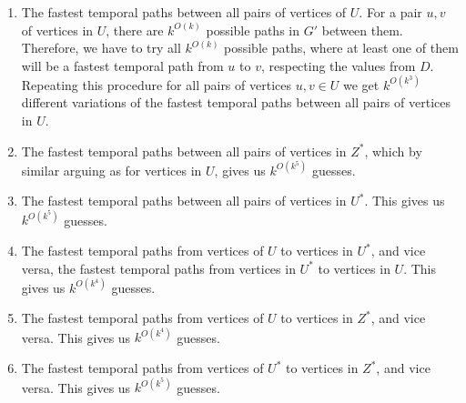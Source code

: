 \documentclass[a4paper,UKenglish,cleveref, autoref, thm-restate]{lipics-v2021}
\newcounter{guesscounter}
\newcommand{\deltaExact}{\textsc{Simple TGR}}
\begin{document}
\begin{enumerate}[G-1.]
	\setcounter{enumi}{\value{guesscounter}}
    \item \label{FPT-guessFTPamongU}
    The fastest temporal paths between all pairs of vertices of $U$.
    For a pair $u,v$ of vertices in $U$, there are $k^{O(k)}$ possible paths in $G'$ between them. 
    Therefore, we have to try all $k^{O(k)}$ possible paths, where at least one of them will be a fastest temporal path from $u$ to $v$, respecting the values from $D$.
    Repeating this procedure for all pairs of vertices $u,v \in U$ we get $k^{O(k^3)}$ different variations of the fastest temporal paths between all pairs of vertices in $U$.
    \item \label{FPT-guessFTPamongZstar}
    The fastest temporal paths between all pairs of vertices in $Z^*$, 
    which by similar arguing as for vertices in $U$, gives us $k^{O(k^5)}$ guesses.
    \item \label{FPT-guessFTPamongUstar}
    The fastest temporal paths between all pairs of vertices in $U^*$.
    This gives us $k^{O(k^5)}$ guesses.
    \item \label{FPT-guessFTPamongUandUstar}
    The fastest temporal paths from vertices of $U$ to vertices in $U^*$,
    and vice versa, the fastest temporal paths from vertices in $U^*$ to vertices in $U$.
    This gives us $k^{O(k^4)}$ guesses.
    \item \label{FPT-guessFTPamongUandZstar}
    The fastest temporal paths from vertices of $U$ to vertices in $Z^*$,
    and vice versa.
    This gives us $k^{O(k^4)}$ guesses.
    \item \label{FPT-guessFTPamongUstarandZstar}
    The fastest temporal paths from vertices of $U^*$ to vertices in $Z^*$,
    and vice versa.
    This gives us $k^{O(k^5)}$ guesses.
	\setcounter{guesscounter}{\value{enumi}}
\end{enumerate}
\end{document}
